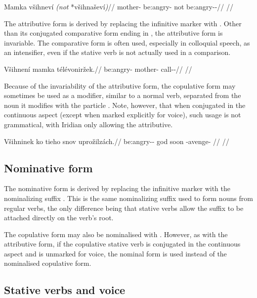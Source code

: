 \ex
\begingl
\gla Mamka všihneví \emph{(not} *všihnaševí\emph{)}//
\glb mother- be:angry- not be:angry-\Av{}-\Cont{}//
\glft {}//
\endgl
\xe


The attributive form is derived by replacing the infinitive marker  with . Other than its conjugated comparative form ending in , the attributive form is invariable. The comparative form is often used, especially in colloquial speech, as an intensifier, even if the stative verb is not actually used in a comparison.

\ex
\begingl
\gla Všihnení mamka télévoniržek.//
\glb be:angry- mother- call-\Av{}-\Pf{}//
\glft {}//
\endgl
\xe

Because of the invariability of the attributive form, the copulative form may sometimes be used as a modifier, similar to a normal verb, separated from the noun it modifies with the particle . Note, however, that when conjugated in the continuous aspect (except when marked explicitly for voice), such usage is not grammatical, with Iridian only allowing the attributive.

\ex
\begingl
\gla Všihninek ko tieho snov uprožilzách.//
\glb be:angry-\Pv{}-\Pf{} \Att{} god soon \Refl{}-avenge- //
\glft {}//
\endgl
\xe


\subsection{Nominative form}
The nominative form is derived by replacing the infinitive marker  with the nominalizing suffix . This is the same nominalizing suffix used to form nouns from regular verbs, the only difference being that stative verbs allow the suffix to be attached directly on the verb's root.

The copulative form may also be nominalised with . However, as with the attributive form, if the copulative stative verb is conjugated in the continuous aspect and is unmarked for voice, the nominal form is used instead of the nominalised copulative form.

\subsection{Stative verbs and voice}

